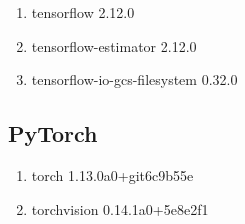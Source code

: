 \documentclass{article}
\begin{document}
\begin{enumerate}
\item tensorflow                2.12.0
\item tensorflow-estimator      2.12.0
\item tensorflow-io-gcs-filesystem 0.32.0
\end{enumerate}

\subsection{PyTorch}

\begin{enumerate}
\item torch                     1.13.0a0+git6c9b55e
\item torchvision               0.14.1a0+5e8e2f1
\end{enumerate}
\end{document}
